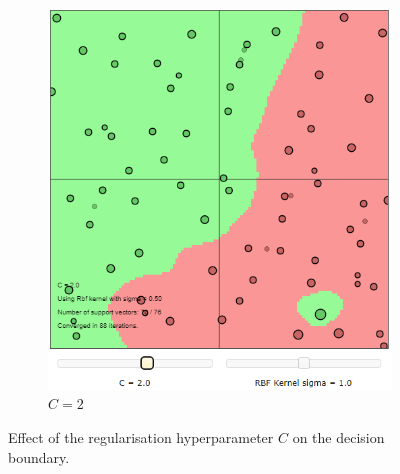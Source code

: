\documentclass{article}
\begin{document}
\begin{figure}[h]
\begin{subfigure}[b]{0.3\textwidth}
                 \includegraphics[width=\textwidth]{Assignment 1/figures/RBF_high_regularisation.png}
                 \caption{$C = 2$}
                 \label{fig:rbf_high_regularisation}
             \end{subfigure}
             \hspace{0.15\textwidth}
            \caption{Effect of the regularisation hyperparameter $C$ on the decision boundary.}
        \end{figure}
        
\end{document}
